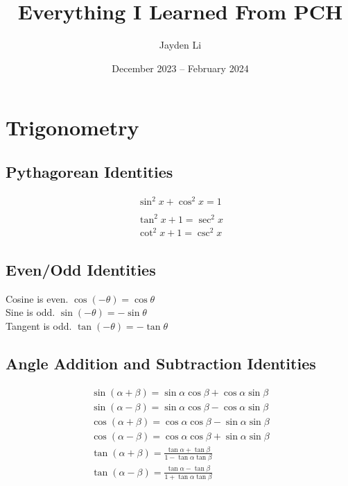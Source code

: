 \documentclass{article}
\title{Everything I Learned From PCH}
\author{Jayden Li}
\date{December 2023 -- February 2024}
\begin{document}
\linespread{1.25}
\fontsize{12pt}{12pt}\selectfont
{}

\maketitle
\tableofcontents


\section{Trigonometry}
\subsection{Pythagorean Identities}
\begin{gather*}
	\sin^2x+\cos^2x=1 \\
	\\
	\tan^2x+1=\sec^2x \\
	\cot^2x+1=\csc^2x
\end{gather*}

\subsection{Even/Odd Identities}
\begin{center}
	Cosine is even. $\cos\left(-\theta\right)=\cos\theta$ \\
	Sine is odd. $\sin\left(-\theta\right)=-\sin\theta$ \\
	Tangent is odd. $\tan\left(-\theta\right)=-\tan\theta$ \\
\end{center}

\subsection{Angle Addition and Subtraction Identities}
\begin{gather*}
	\sin\left(\alpha+\beta\right)=
	\sin\alpha\cos\beta+\cos\alpha\sin\beta \\
	\sin\left(\alpha-\beta\right)=
	\sin\alpha\cos\beta-\cos\alpha\sin\beta \\
	\cos\left(\alpha+\beta\right)=
	\cos\alpha\cos\beta-\sin\alpha\sin\beta \\
	\cos\left(\alpha-\beta\right)=
	\cos\alpha\cos\beta+\sin\alpha\sin\beta \\
	\hyperref[proof:tanadd]{
		\tan\left(\alpha+\beta\right)=
		\frac{\tan\alpha+\tan\beta}{1-\tan\alpha\tan\beta}
		} \\
	\hyperref[proof:tansub]{
		\tan\left(\alpha-\beta\right)=
		\frac{\tan\alpha-\tan\beta}{1+\tan\alpha\tan\beta}
	} \\
\end{gather*}
\end{document}
